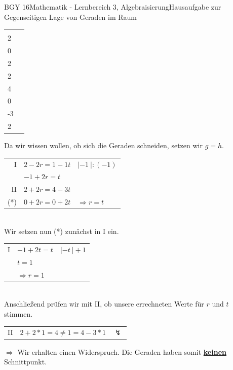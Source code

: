 \documentclass[oneside,openany,headings=optiontotoc,11pt,numbers=noenddot]{scrreprt}
\begin{document}
\begin{worksheet}{BGY 16}{Mathematik - Lernbereich 3, Algebraisierung}{Hausaufgabe zur Gegenseitigen Lage von Geraden im Raum}
\begin{framed}
\begin{tabularx}{\textwidth}{X|X}
				\(g: \vec{x} = \left(\begin{array}{c}2\\2\\0\end{array}\right) + r*\left(\begin{array}{c}-2\\2\\2\end{array}\right)\) & \(h: \vec{x} = \left(\begin{array}{c}1\\4\\0\end{array}\right) + r*\left(\begin{array}{c}-1\\-3\\2\end{array}\right)\)
			\end{tabularx}
			Da wir wissen wollen, ob sich die Geraden schneiden, setzen wir \(g=h\).\\
			\begin{tabularx}{\textwidth}{rll}
				I & \(2-2r = 1 - 1t\) & \(|-1\ |:(-1)\)\\
				& \(-1 +2r = t\)\\
				II & \(2+2r = 4 - 3t\) &\\
				(*) & \(0 +2r = 0 + 2t\) & \(\Rightarrow r=t\)\\
			\end{tabularx}\\
			Wir setzen nun (*) zunächst in I ein.\\
			\begin{tabularx}{\textwidth}{rll}
				I & \(-1 +2t = t\) & \(|-t\ |+1\)\\
				& \(t = 1\)\\
				& \(\Rightarrow r = 1\)
			\end{tabularx}\\
			Anschließend prüfen wir mit II, ob unsere errechneten Werte für \(r\) und \(t\) stimmen.\\
			\begin{tabularx}{\textwidth}{rll}
				II & \(2+2*1 = 4 \neq 1 = 4 - 3*1\) & \(\lightning\)\\
			\end{tabularx}
			\(\Rightarrow\) Wir erhalten einen Widerspruch. Die Geraden haben somit \underline{\textbf{keinen}} Schnittpunkt.\\
		\end{framed}
	\end{worksheet}
\end{document}
